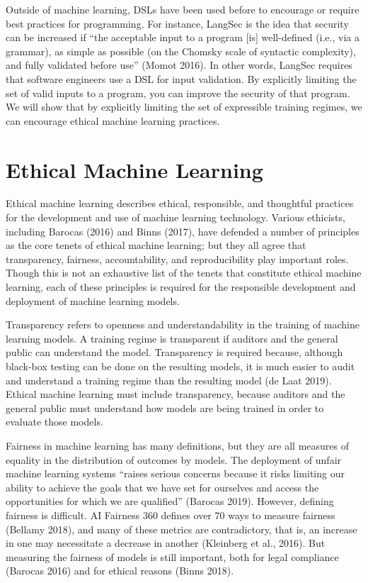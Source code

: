 \documentclass[letterpaper]{article}
\begin{document}
Outside of machine learning, DSLs have been used before to encourage or require best practices for programming. For instance, LangSec is the idea that security can be increased if ``the acceptable input to a program [is] well-defined (i.e., via a grammar), as simple as possible (on the Chomsky scale of syntactic complexity), and fully validated before use” (Momot 2016). In other words, LangSec requires that software engineers use a DSL for input validation. By explicitly limiting the set of valid inputs to a program, you can improve the security of that program. We will show that by explicitly limiting the set of expressible training regimes, we can encourage ethical machine learning practices.

\section{Ethical Machine Learning}
Ethical machine learning describes ethical, responsible, and thoughtful practices for the development and use of machine learning technology. Various ethicists, including Barocas (2016) and Binns (2017), have defended a number of principles as the core tenets of ethical machine learning; but they all agree that transparency, fairness, accountability, and reproducibility play important roles. Though this is not an exhaustive list of the tenets that constitute ethical machine learning, each of these principles is required for the responsible development and deployment of machine learning models.

Transparency refers to openness and understandability in the training of machine learning models. A training regime is transparent if auditors and the general public can understand the model. Transparency is required because, although black-box testing can be done on the resulting models, it is much easier to audit and understand a training regime than the resulting model (de Laat 2019). Ethical machine learning must include transparency, because auditors and the general public must understand how models are being trained in order to evaluate those models.

Fairness in machine learning has many definitions, but they are all measures of equality in the distribution of outcomes by models. The deployment of unfair machine learning systems ``raises serious concerns because it risks limiting our ability to achieve the goals that we have set for ourselves and access the opportunities for which we are qualified” (Barocas 2019). However, defining fairness is difficult. AI Fairness 360 defines over 70 ways to measure fairness (Bellamy 2018), and many of these metrics are contradictory, that is, an increase in one may necessitate a decrease in another (Kleinberg et al., 2016). But measuring the fairness of models is still important, both for legal compliance (Barocas 2016) and for ethical reasons (Binns 2018).
\end{document}
